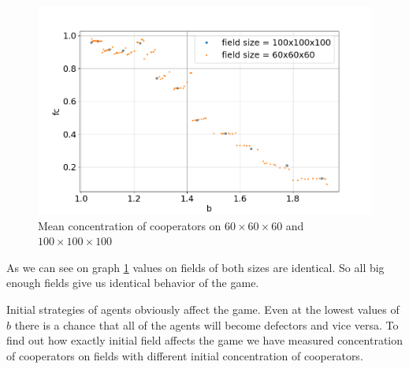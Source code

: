 \documentclass[a4paper]{jpconf}
\begin{document}
\begin{figure}[h]
	\centering
	
	\includegraphics[width = \textwidth]{Fc_60_and_100.png}
	\caption{Mean concentration of cooperators on $60\times60\times60$ and $100\times100\times100$	}
	\label{fig:Fc100}

\end{figure}

As we can see on graph \ref{fig:Fc100} values on fields of both sizes are identical. So all big enough fields give us identical behavior of the game.

Initial strategies of agents obviously affect the game. Even at the lowest values of $b$ there is a chance that all of the agents will become defectors and vice versa. To find out how exactly initial field affects the game we have measured concentration of cooperators on fields with different initial concentration of cooperators.
\end{document}
